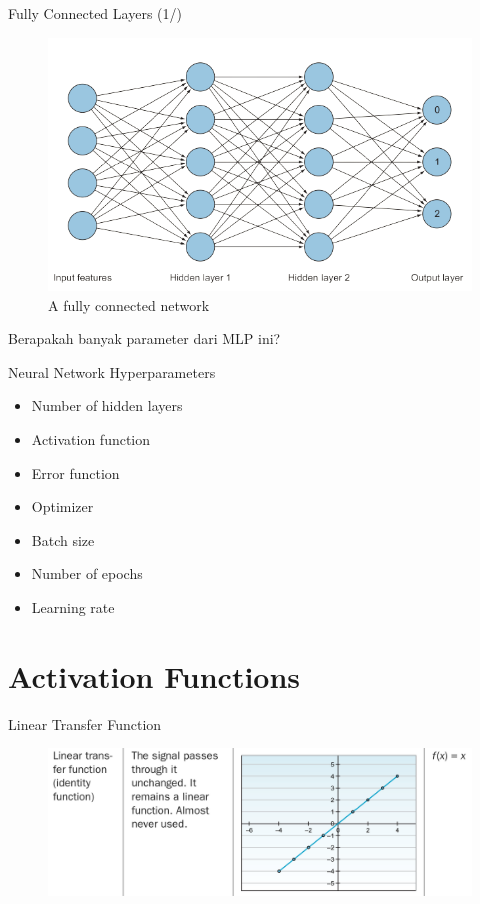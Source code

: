 \documentclass{beamer}
\begin{document}
\begin{frame}{Fully Connected Layers (1/)}
	\begin{figure}[ht]
	\centering
	\includegraphics[scale=0.4]{images/fully-connected}
	\caption{A fully connected network}
\end{figure}						
Berapakah banyak parameter dari MLP ini?
\end{frame}

\begin{frame}{Neural Network Hyperparameters}
	\begin{itemize}
		\item<2-> Number of hidden layers
		\item<3-> Activation function
		\item<4-> Error function
		\item<5-> Optimizer
		\item<6-> Batch size
		\item<7-> Number of epochs
		\item<8-> Learning rate 
	\end{itemize}
\end{frame}

\section{Activation Functions}
\begin{frame}{Linear Transfer Function}
	\begin{figure}[ht]
	\centering
	\includegraphics[scale=0.25]{images/linear-transformation}
\end{figure}							
\end{frame}
\end{document}
